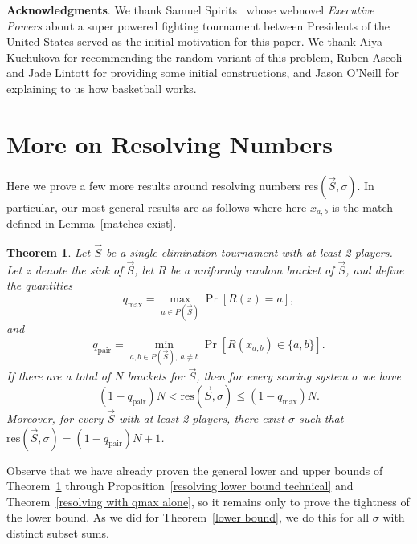 \documentclass[12pt,letterpaper]{article}
\newtheorem{thm}{Theorem}[section]
\theoremstyle{definition}
\newcommand{\sig}{\sigma}
\renewcommand{\1}{\mathbbm{1}}
\newcommand{\tour}{\vec{S}}
\newcommand{\res}{\mathrm{res}}
\begin{document}
\textbf{Acknowledgments}.  We thank Samuel Spirits~\cite{spirits} whose webnovel \textit{Executive Powers} about a super powered fighting tournament between Presidents of the United States served as the initial motivation for this paper.  We thank Aiya Kuchukova for recommending the random variant of this problem, Ruben Ascoli and Jade Lintott for providing some initial constructions, and Jason O'Neill for explaining to us how basketball works.







\appendix 

\section{More on Resolving Numbers}
Here we prove a few more results around resolving numbers $\res(\tour,\sig)$.  In particular, our most general results are as follows where here $x_{a,b}$ is the match defined in Lemma~\ref{matches exist}.


\begin{thm}\label{appendix resolving}
	Let $\tour$ be a single-elimination tournament with at least 2 players.   Let $z$ denote the sink of $\tour$, let $R$ be a uniformly random bracket of $\tour$, and define the quantities
	\[q_{\max}=\max_{a\in P(\tour)}\Pr[R(z)=a],\]
	and 
	\[q_{\mathrm{pair}}=\min_{a,b\in P(\tour),\ a\ne b} \Pr[R(x_{a,b})\in \{a,b\}].\]
	If there are a total of $N$ brackets for $\tour$, then for every scoring system $\sig$ we have
	\[(1-q_{\mathrm{pair}})N< \res(\tour,\sig)\le (1-q_{\max})N.\]
	Moreover, for every $\tour$ with at least 2 players, there exist $\sig$ such that $\res(\tour,\sig)=(1-q_{\mathrm{pair}})N+1$.
\end{thm}

Observe that we have already proven the general lower and upper bounds of Theorem~\ref{appendix resolving} through Proposition~\ref{resolving lower bound technical} and Theorem~\ref{resolving with qmax alone}, so it remains only to prove the tightness of the lower bound.  As we did for Theorem~\ref{lower bound}, we do this for all $\sig$ with distinct subset sums.
\end{document}
